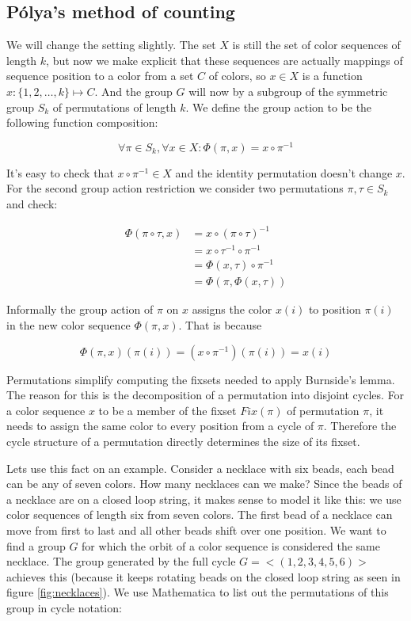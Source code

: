 \subsection{P\'{o}lya's method of counting}

We will change the setting slightly. The set $X$ is still the set of color sequences of length $k$, but now we make explicit that these sequences are actually mappings of sequence position to a color from a set $C$ of colors, so $x \in X$ is a function $x: \{1, 2, \ldots, k\} \mapsto C$. And the group $G$ will now by a subgroup of the symmetric group $S_k$ of permutations of length $k$. We define the group action to be the following function composition:

$$
\forall \pi \in S_k, \forall x \in X: \Phi(\pi, x) = x \circ \pi^{-1}
$$
 
It's easy to check that $x \circ \pi^{-1} \in X$ and the identity permutation doesn't change $x$. For the second group action restriction we consider two permutations $\pi, \tau \in S_k$ and check:

\begin{align*}
\Phi(\pi \circ \tau, x) &= x \circ (\pi \circ \tau)^{-1} \\
                        &= x \circ \tau^{-1} \circ \pi^{-1} \\
                        &= \Phi(x, \tau) \circ \pi^{-1} \\
                        &= \Phi(\pi, \Phi(x, \tau))
\end{align*}

Informally the group action of $\pi$ on $x$ assigns the color $x(i)$ to position $\pi(i)$ in the new color sequence $\Phi(\pi, x)$. That is because

$$
\Phi(\pi, x)(\pi(i)) = (x \circ \pi^{-1}) (\pi(i)) = x(i)
$$

Permutations simplify computing the fixsets needed to apply Burnside's lemma. The reason for this is the decomposition of a permutation into disjoint cycles. For a color sequence $x$ to be a member of the fixset $Fix(\pi)$ of permutation $\pi$, it needs to assign the same color to every position from a cycle of $\pi$. Therefore the cycle structure of a permutation directly determines the size of its fixset.

Lets use this fact on an example. Consider a necklace with six beads, each bead can be any of seven colors. How many necklaces can we make? Since the beads of a necklace are on a closed loop string, it makes sense to model it like this: we use color sequences of length six from seven colors. The first bead of a necklace can move from first to last and all other beads shift over one position. We want to find a group $G$ for which the orbit of a color sequence is considered the same necklace. The group generated by the full cycle $G = <(1, 2, 3, 4, 5, 6)>$ achieves this (because it keeps rotating beads on the closed loop string as seen in figure \ref{fig:necklaces}). We use Mathematica to list out the permutations of this group in cycle notation:

